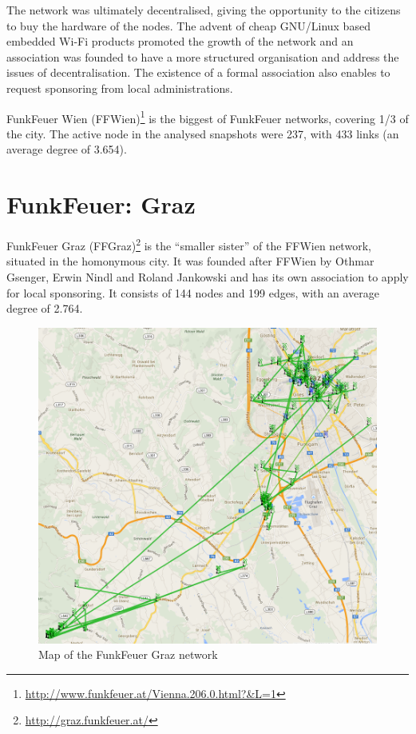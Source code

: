 \documentclass[oneside,openany]{memoir}
\begin{document}
The network was ultimately decentralised, giving the opportunity to the
citizens to buy the hardware of the nodes. The advent of cheap GNU/Linux
based embedded Wi-Fi products promoted the growth of the network and an
association was founded to have a more structured organisation and
address the issues of decentralisation. The existence of a formal
association also enables to request sponsoring from local
administrations.

FunkFeuer Wien (FFWien)\footnote{\url{http://www.funkfeuer.at/Vienna.206.0.html?\&L=1}}
is the biggest of FunkFeuer networks, covering 1/3 of the city. The
active node in the analysed snapshots were 237, with 433 links (an
average degree of 3.654).

\section{FunkFeuer: Graz}\label{funkfeuer-graz}

FunkFeuer Graz (FFGraz)\footnote{\url{http://graz.funkfeuer.at/}} is the
``smaller sister'' of the FFWien network, situated in the homonymous
city. It was founded after FFWien by Othmar Gsenger, Erwin Nindl and
Roland Jankowski and has its own association to apply for local
sponsoring. It consists of 144 nodes and 199 edges, with an average
degree of 2.764. 

\begin{figure}[!htb]
  \centering
  \includegraphics{images/graz_map.png}
  \caption{Map of the FunkFeuer Graz network}
\end{figure}
\end{document}
